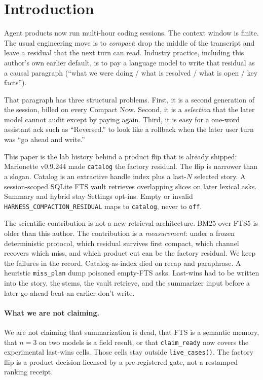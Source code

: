 \documentclass[11pt]{article}
\newcommand{\mode}[1]{\texttt{#1}}
\begin{document}
\section{Introduction}
\label{sec:intro}

Agent products now run multi-hour coding sessions. The context window is
finite. The usual engineering move is to \emph{compact}: drop the middle
of the transcript and leave a residual that the next turn can read.
Industry practice, including this author's own earlier default, is to
pay a language model to write that residual as a causal paragraph
(``what we were doing / what is resolved / what is open / key facts'').

That paragraph has three structural problems. First, it is a second
generation of the session, billed on every Compact Now. Second, it is a
\emph{selection} that the later model cannot audit except by paying
again. Third, it is easy for a one-word assistant ack such as
``Reversed.'' to look like a rollback when the later user turn was
``go ahead and write.''

This paper is the lab history behind a product flip that is already
shipped: Marionette v0.9.244 made \mode{catalog} the factory residual.
The flip is narrower than a slogan. Catalog is an extractive handle
index plus a last-$N$ selected story. A session-scoped SQLite FTS vault
retrieves overlapping slices on later lexical asks. Summary and hybrid
stay Settings opt-ins. Empty or invalid
\texttt{HARNESS\_COMPACTION\_RESIDUAL} maps to \mode{catalog}, never to
\mode{off}.

The scientific contribution is not a new retrieval architecture. BM25
over FTS5 is older than this author. The contribution is a
\emph{measurement}: under a frozen deterministic protocol, which residual
survives first compact, which channel recovers which miss, and which
product cut can be the factory residual. We keep the failures in the
record. Catalog-as-index died on recap and paraphrase. A heuristic
\texttt{miss\_plan} dump poisoned empty-FTS asks. Last-wins had to be
written into the story, the stems, the vault retrieve, and the
summarizer input before a later go-ahead beat an earlier don't-write.

\paragraph{What we are not claiming.}
We are not claiming that summarization is dead, that FTS is a semantic
memory, that $n{=}3$ on two models is a field result, or that
\texttt{claim\_ready} now covers the experimental last-wins cells. Those
cells stay outside \texttt{live\_cases()}. The factory flip is a product
decision licensed by a pre-registered gate, not a restamped ranking
receipt.
\end{document}
